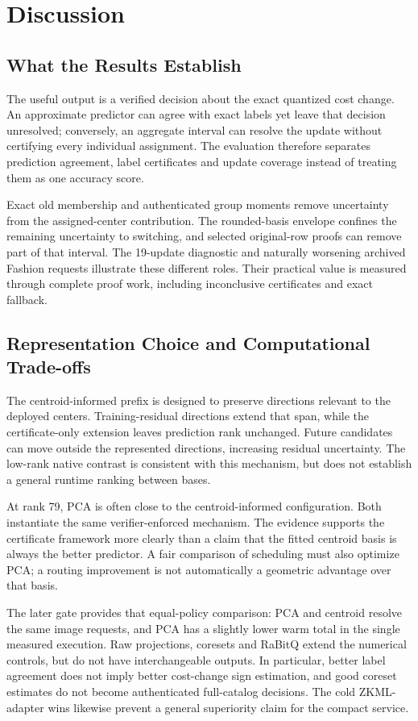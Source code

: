 \section{Discussion}
\label{sec:discussion}
\subsection{What the Results Establish}
The useful output is a verified decision about the exact quantized cost
change. An approximate predictor can agree with exact labels yet leave that
decision unresolved; conversely, an aggregate interval can resolve the
update without certifying every individual assignment. The evaluation
therefore separates prediction agreement, label certificates and update
coverage instead of treating them as one accuracy score.

Exact old membership and authenticated group moments remove uncertainty
from the assigned-center contribution. The rounded-basis envelope confines
the remaining uncertainty to switching, and selected original-row proofs
can remove part of that interval. The 19-update diagnostic and naturally
worsening archived Fashion requests illustrate these different roles.
Their practical value is measured through complete proof work, including
inconclusive certificates and exact fallback.

\subsection{Representation Choice and Computational Trade-offs}
The centroid-informed prefix is designed to preserve directions relevant
to the deployed centers. Training-residual directions extend that span,
while the certificate-only extension leaves prediction rank unchanged.
Future candidates can move outside the represented directions, increasing
residual uncertainty. The low-rank native contrast is consistent with this
mechanism, but does not establish a general runtime ranking between bases.

At rank 79, PCA is often close to the centroid-informed configuration. Both
instantiate the same verifier-enforced mechanism. The evidence supports the
certificate framework more clearly than a claim that the fitted centroid
basis is always the better predictor. A fair comparison of scheduling must
also optimize PCA; a routing improvement is not automatically a geometric
advantage over that basis.

The later gate provides that equal-policy comparison: PCA and centroid
resolve the same image requests, and PCA has a slightly lower warm total
in the single measured execution. Raw projections, coresets and RaBitQ
extend the numerical controls, but do not have interchangeable outputs.
In particular, better label agreement does not imply better cost-change
sign estimation, and good coreset estimates do not become authenticated
full-catalog decisions. The cold ZKML-adapter wins likewise prevent a
general superiority claim for the compact service.

